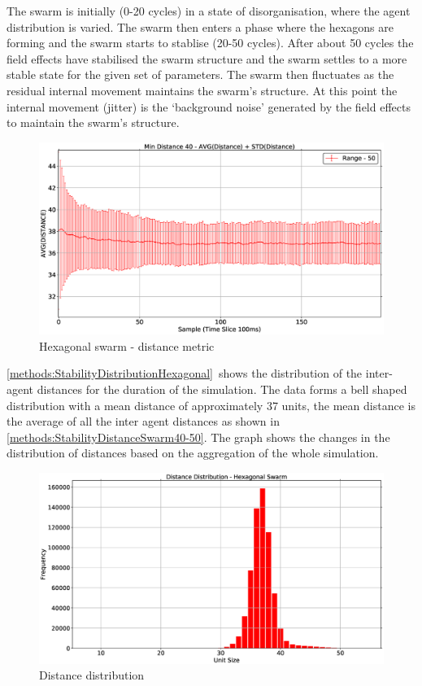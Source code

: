 The swarm is initially (0-20 cycles) in a state of disorganisation, where the agent distribution is varied. The swarm then enters a phase where the hexagons are forming and the swarm starts to stablise (20-50 cycles). After about 50 cycles the field effects have stabilised the swarm structure and the swarm settles to a more stable state for the given set of parameters. The swarm then fluctuates as the residual internal movement maintains the swarm's structure. At this point the internal movement (jitter) is the `background noise' generated by the field effects to maintain the swarm's structure.

\begin{figure}[H]
\begin{center}
\includegraphics[width=13cm]{CHAPTER-5/figures/StabilityDistanceSwarm40-50}
\end{center}
\caption{Hexagonal swarm - distance metric\label{methods:StabilityDistanceSwarm40-50}}
\end{figure}

\autoref{methods:StabilityDistributionHexagonal}~shows the distribution of the inter-agent distances for the duration of the simulation. The data forms a bell shaped distribution with a mean distance of approximately 37 units, the mean distance is the average of all the inter agent distances as shown in \autoref{methods:StabilityDistanceSwarm40-50}. The graph shows the changes in the distribution of distances based on the aggregation of the whole simulation. 
\begin{figure}[H]
\begin{center}
\includegraphics[width=13cm]{CHAPTER-5/figures/StabilityDistibutionHexagonal}
\end{center}
\caption{Distance distribution\label{methods:StabilityDistributionHexagonal}}
\end{figure}

